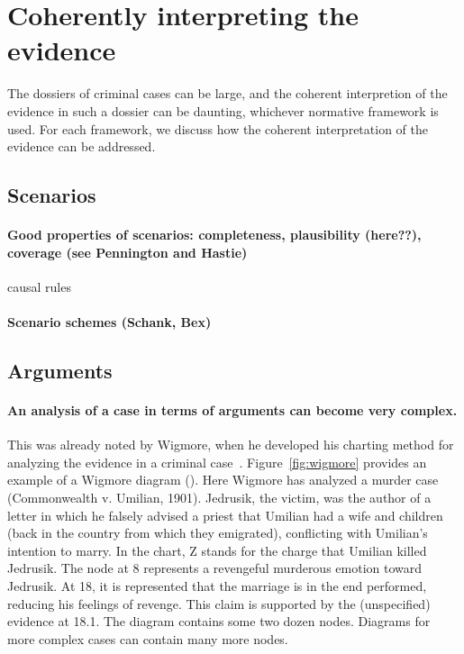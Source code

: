\documentclass[10pt]{article}
\begin{document}
\section{Coherently interpreting the evidence}
\label{sec:cohint}

The dossiers of criminal cases can be large, and the coherent interpretion of the evidence in such a dossier can be daunting, whichever normative framework is used. For each framework, we discuss how the coherent interpretation of the evidence can be addressed.

\subsection{Scenarios}




\paragraph{	Good properties of scenarios: completeness, plausibility (here??), coverage (see Pennington and Hastie)}

causal rules

\paragraph{	Scenario schemes (Schank, Bex)}

\subsection{Arguments}


\paragraph{An analysis of a case in terms of arguments can become very complex.} This was already noted by Wigmore, when he developed his charting method for analyzing the evidence in a criminal case~\citep{wigmore1913,wigmore1931}. Figure~\ref{fig:wigmore} provides an example of a Wigmore diagram (\citeyear{wigmore1931}). Here Wigmore has analyzed a murder case (Commonwealth v. Umilian, 1901). Jedrusik, the victim, was the author of a letter in which he falsely advised a priest that Umilian had a wife and children (back in the country from which they emigrated), conflicting with Umilian’s intention to marry. In the chart, Z stands for the charge that Umilian killed Jedrusik. The node at 8 represents a revengeful murderous emotion toward Jedrusik. At 18, it is represented that the marriage is in the end performed, reducing his feelings of revenge. This claim is supported by the (unspecified) evidence at 18.1. The diagram contains some two dozen nodes. Diagrams for more complex cases can contain many more nodes.
\end{document}
